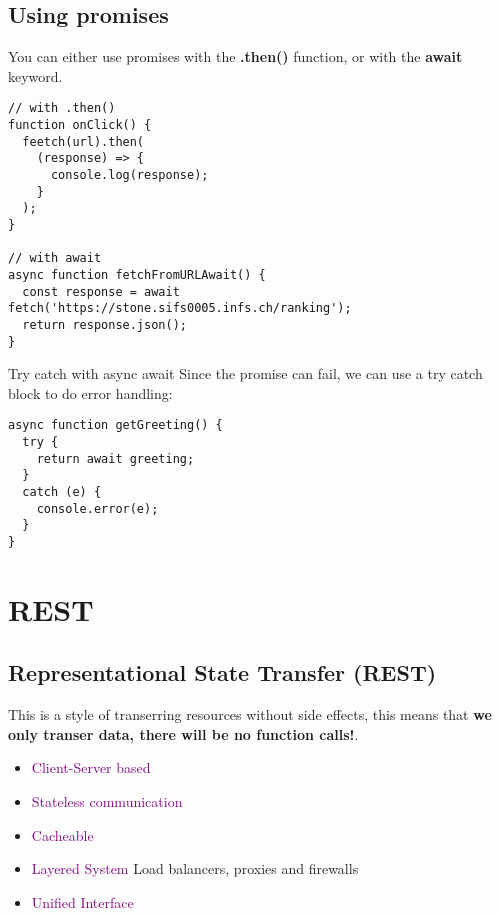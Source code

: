 \documentclass[main.tex,fontsize=6pt,paper=a4,paper=landscape,DIV=calc,]{scrartcl}
\begin{document}
\begin{multicols*}{4}
\subsection{Using promises}  
You can either use promises with the \textbf{.then()} function, or with the \textbf{await} keyword.
\vspace{-2mm}
\begin{lstlisting}
// with .then()
function onClick() {
  feetch(url).then(
    (response) => {
      console.log(response);
    }
  );
}

// with await
async function fetchFromURLAwait() {
  const response = await fetch('https://stone.sifs0005.infs.ch/ranking');
  return response.json();
}
\end{lstlisting}
\vspace{2mm}
Try catch with async await  
Since the promise can fail, we can use a try catch block to do error handling:\newline 
\vspace{-2mm}
\begin{lstlisting}
async function getGreeting() {
  try {
    return await greeting;
  }
  catch (e) {
    console.error(e);
  }
}
\end{lstlisting}
\vspace{2mm}





\section{REST}

\subsection{Representational State Transfer (REST)}  
This is a style of transerring resources without side effects, this means that \textbf{we only transer data, there will be no function calls!}.
\begin{itemize}
\item \textcolor{purple}{Client-Server based}
\item \textcolor{purple}{Stateless communication}
\item \textcolor{purple}{Cacheable}
\item \textcolor{purple}{Layered System} Load balancers, proxies and firewalls
\item \textcolor{purple}{Unified Interface}
\end{itemize} 


\end{multicols*}
\end{document}
